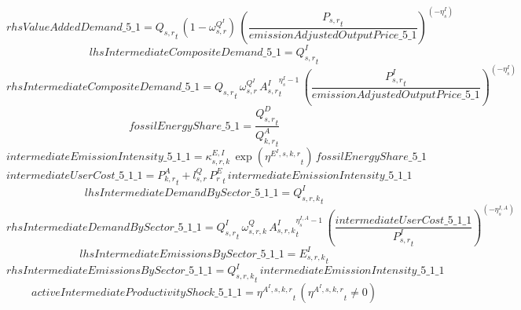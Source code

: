 \begin{dmath*}
rhsValueAddedDemand\_5\_1 = {{Q_{s,r}}}_{t}\, \left(1-{{\omega^{Q^{I}}_{s,r}}}\right)\, \left(\frac{{{P_{s,r}}}_{t}}{{emissionAdjustedOutputPrice\_5\_1}}\right)^{\left(-{{\eta^{I}_{s}}}\right)}
\end{dmath*}
\begin{dmath*}
lhsIntermediateCompositeDemand\_5\_1 = {{Q^{I}_{s,r}}}_{t}
\end{dmath*}
\begin{dmath*}
rhsIntermediateCompositeDemand\_5\_1 = {{Q_{s,r}}}_{t}\, {{\omega^{Q^{I}}_{s,r}}}\, {{A^{I}_{s,r}}}_{t}^{{{\eta^{I}_{s}}}-1}\, \left(\frac{{{P^{I}_{s,r}}}_{t}}{{emissionAdjustedOutputPrice\_5\_1}}\right)^{\left(-{{\eta^{I}_{s}}}\right)}
\end{dmath*}
\begin{dmath*}
fossilEnergyShare\_5\_1 = \frac{{{Q^{D}_{s,r}}}_{t}}{{{Q^{A}_{k,r}}}_{t}}
\end{dmath*}
\begin{dmath*}
intermediateEmissionIntensity\_5\_1\_1 = {{\kappa^{E,I}_{s,r,k}}}\, \exp\left({{\eta^{E^{I},s,k,r}}}_{t}\right)\, {fossilEnergyShare\_5\_1}
\end{dmath*}
\begin{dmath*}
intermediateUserCost\_5\_1\_1 = {{P^{A}_{k,r}}}_{t}+{{l^{Q}_{s,r}}}\, {{P^E_r}}_{t}\, {intermediateEmissionIntensity\_5\_1\_1}
\end{dmath*}
\begin{dmath*}
lhsIntermediateDemandBySector\_5\_1\_1 = {{Q^{I}_{s,r,k}}}_{t}
\end{dmath*}
\begin{dmath*}
rhsIntermediateDemandBySector\_5\_1\_1 = {{Q^{I}_{s,r}}}_{t}\, {{\omega^{Q}_{s,r,k}}}\, {{A^{I}_{s,r,k}}}_{t}^{{{\eta^{I,A}_{s}}}-1}\, \left(\frac{{intermediateUserCost\_5\_1\_1}}{{{P^{I}_{s,r}}}_{t}}\right)^{\left(-{{\eta^{I,A}_{s}}}\right)}
\end{dmath*}
\begin{dmath*}
lhsIntermediateEmissionsBySector\_5\_1\_1 = {{E^I_{s,r,k}}}_{t}
\end{dmath*}
\begin{dmath*}
rhsIntermediateEmissionsBySector\_5\_1\_1 = {{Q^{I}_{s,r,k}}}_{t}\, {intermediateEmissionIntensity\_5\_1\_1}
\end{dmath*}
\begin{dmath*}
activeIntermediateProductivityShock\_5\_1\_1 = {{\eta^{A^{I},s,k,r}}}_{t}\, \left({{\eta^{A^{I},s,k,r}}}_{t}\neq 0\right)
\end{dmath*}
